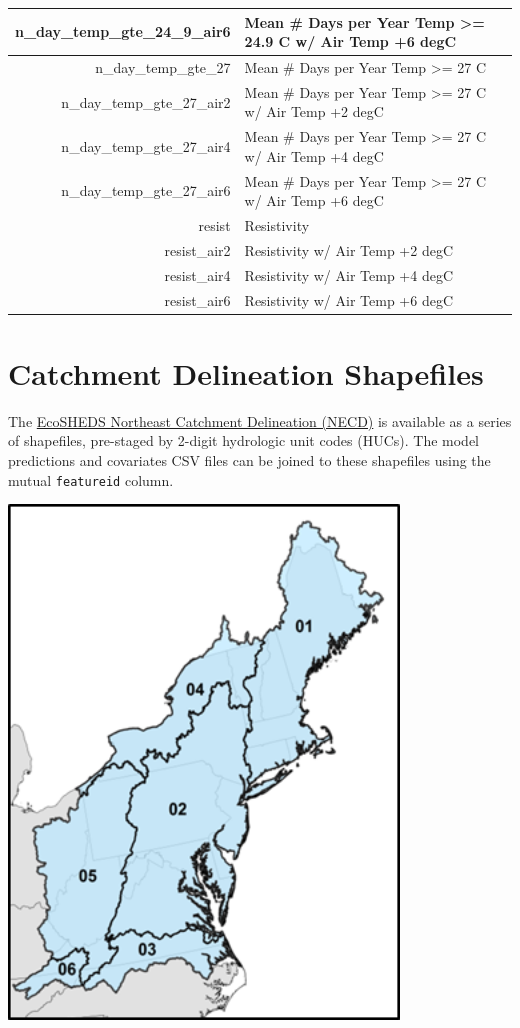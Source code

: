 \documentclass[
]{book}
\begin{document}
\begin{tabular}{r|l}
n\_day\_temp\_gte\_24\_9\_air6 & Mean \# Days per Year Temp >= 24.9 C w/ Air Temp +6 degC\\
\hline
n\_day\_temp\_gte\_27 & Mean \# Days per Year Temp >= 27 C\\
\hline
n\_day\_temp\_gte\_27\_air2 & Mean \# Days per Year Temp >= 27 C w/ Air Temp +2 degC\\
\hline
n\_day\_temp\_gte\_27\_air4 & Mean \# Days per Year Temp >= 27 C w/ Air Temp +4 degC\\
\hline
n\_day\_temp\_gte\_27\_air6 & Mean \# Days per Year Temp >= 27 C w/ Air Temp +6 degC\\
\hline
resist & Resistivity\\
\hline
resist\_air2 & Resistivity w/ Air Temp +2 degC\\
\hline
resist\_air4 & Resistivity w/ Air Temp +4 degC\\
\hline
resist\_air6 & Resistivity w/ Air Temp +6 degC\\
\hline
\end{tabular}

\section{Catchment Delineation Shapefiles}\label{catchment-delineation-shapefiles}

The \href{https://ecosheds.github.io/necd/}{EcoSHEDS Northeast Catchment Delineation (NECD)} is available as a series of shapefiles, pre-staged by 2-digit hydrologic unit codes (HUCs). The model predictions and covariates CSV files can be joined to these shapefiles using the mutual \texttt{featureid} column.

\includegraphics[width=4.08in]{img/hydrologic-regions}
\end{document}
